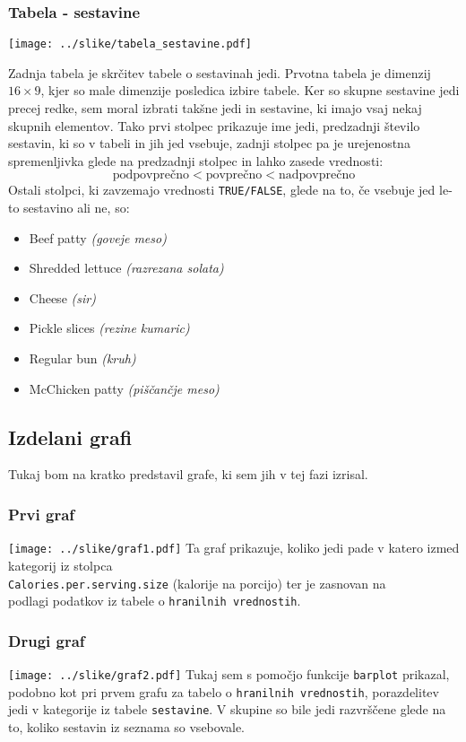 \documentclass[hidelinks, 11pt,a4paper]{article}
\begin{document}
\subsubsection{Tabela - sestavine}
\vspace{5mm}
\texttt{[image: ../slike/tabela\_sestavine.pdf]}

\noindent
Zadnja tabela je skrčitev tabele o sestavinah jedi. Prvotna tabela je dimenzij $16 \times 9$, kjer so male dimenzije posledica izbire tabele. Ker so skupne sestavine jedi precej redke, sem moral izbrati takšne jedi in sestavine, ki imajo vsaj nekaj skupnih elementov. Tako prvi stolpec prikazuje ime jedi, predzadnji število sestavin, ki so v tabeli in jih jed vsebuje, zadnji stolpec pa je urejenostna spremenljivka glede na predzadnji stolpec in lahko zasede vrednosti: $$\mbox{podpovprečno} < \mbox{povprečno} < \mbox{nadpovprečno}$$
Ostali stolpci, ki zavzemajo vrednosti \verb|TRUE/FALSE|, glede na to, če vsebuje jed le-to sestavino ali ne, so:
\begin{itemize}
	\item Beef patty \textit{(goveje meso)}
	\item Shredded lettuce \textit{(razrezana solata)}
	\item Cheese \textit{(sir)}
	\item Pickle slices \textit{(rezine kumaric)}
	\item Regular bun \textit{(kruh)}
	\item McChicken patty \textit{(piščančje meso)}
\end{itemize}

\newpage
\subsection{Izdelani grafi}
Tukaj bom na kratko predstavil grafe, ki sem jih v tej fazi izrisal.

\subsubsection{Prvi graf}
\texttt{[image: ../slike/graf1.pdf]}
Ta graf prikazuje, koliko jedi pade v katero izmed kategorij iz stolpca \\ \verb|Calories.per.serving.size| (kalorije na porcijo) ter je zasnovan na \\ podlagi podatkov iz tabele o \verb|hranilnih vrednostih|.

\subsubsection{Drugi graf}
\texttt{[image: ../slike/graf2.pdf]}
Tukaj sem s pomočjo funkcije \verb|barplot| prikazal, podobno kot pri prvem grafu za tabelo o \verb|hranilnih vrednostih|, porazdelitev jedi v kategorije iz tabele \verb|sestavine|. V skupine so bile jedi razvrščene glede na to, koliko sestavin iz seznama so vsebovale.
\end{document}
